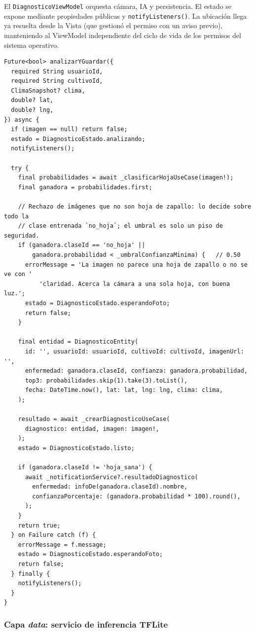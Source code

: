 \documentclass[12pt,a4paper]{article}
\begin{document}
El \texttt{DiagnosticoViewModel} orquesta cámara, IA y persistencia. El estado se
expone mediante propiedades públicas y \texttt{notifyListeners()}. La ubicación
llega ya resuelta desde la Vista (que gestionó el permiso con un aviso previo),
manteniendo al ViewModel independiente del ciclo de vida de los permisos del
sistema operativo.

\begin{lstlisting}[caption={Fragmento del ViewModel de diagnóstico: análisis, rechazo y guardado}, label={lst:viewmodel}]
Future<bool> analizarYGuardar({
  required String usuarioId,
  required String cultivoId,
  ClimaSnapshot? clima,
  double? lat,
  double? lng,
}) async {
  if (imagen == null) return false;
  estado = DiagnosticoEstado.analizando;
  notifyListeners();

  try {
    final probabilidades = await _clasificarHojaUseCase(imagen!);
    final ganadora = probabilidades.first;

    // Rechazo de imágenes que no son hoja de zapallo: lo decide sobre todo la
    // clase entrenada `no_hoja`; el umbral es solo un piso de seguridad.
    if (ganadora.claseId == 'no_hoja' ||
        ganadora.probabilidad < _umbralConfianzaMinima) {   // 0.50
      errorMessage = 'La imagen no parece una hoja de zapallo o no se ve con '
          'claridad. Acerca la cámara a una sola hoja, con buena luz.';
      estado = DiagnosticoEstado.esperandoFoto;
      return false;
    }

    final entidad = DiagnosticoEntity(
      id: '', usuarioId: usuarioId, cultivoId: cultivoId, imagenUrl: '',
      enfermedad: ganadora.claseId, confianza: ganadora.probabilidad,
      top3: probabilidades.skip(1).take(3).toList(),
      fecha: DateTime.now(), lat: lat, lng: lng, clima: clima,
    );

    resultado = await _crearDiagnosticoUseCase(
      diagnostico: entidad, imagen: imagen!,
    );
    estado = DiagnosticoEstado.listo;

    if (ganadora.claseId != 'hoja_sana') {
      await _notificationService?.resultadoDiagnostico(
        enfermedad: infoDe(ganadora.claseId).nombre,
        confianzaPorcentaje: (ganadora.probabilidad * 100).round(),
      );
    }
    return true;
  } on Failure catch (f) {
    errorMessage = f.message;
    estado = DiagnosticoEstado.esperandoFoto;
    return false;
  } finally {
    notifyListeners();
  }
}
\end{lstlisting}

\subsubsection{Capa \textit{data}: servicio de inferencia TFLite}
\end{document}
